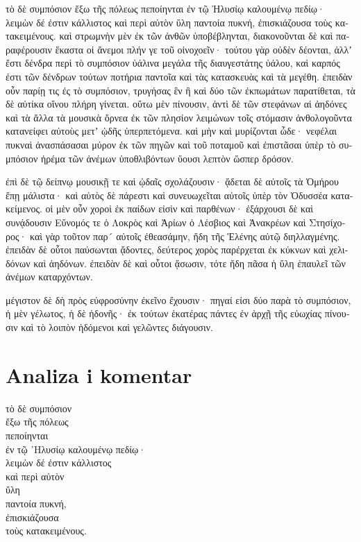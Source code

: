 {\large

\begin{greek}

\noindent τὸ δὲ συμπόσιον ἔξω τῆς πόλεως πεποίηνται ἐν τῷ Ἠλυσίῳ καλουμένῳ πεδίῳ· λειμὼν δέ ἐστιν κάλλιστος καὶ περὶ αὐτὸν ὕλη παντοία πυκνή, ἐπισκιάζουσα τοὺς κατακειμένους. καὶ στρωμνὴν μὲν ἐκ τῶν ἀνθῶν ὑποβέβληνται, διακονοῦνται δὲ καὶ παραφέρουσιν ἕκαστα οἱ ἄνεμοι πλήν γε τοῦ οἰνοχοεῖν· τούτου γὰρ οὐδὲν δέονται, ἀλλʼ ἔστι δένδρα περὶ τὸ συμπόσιον ὑάλινα μεγάλα τῆς διαυγεστάτης ὑάλου, καὶ καρπός ἐστι τῶν δένδρων τούτων ποτήρια παντοῖα καὶ τὰς κατασκευὰς καὶ τὰ μεγέθη. ἐπειδὰν οὖν παρίῃ τις ἐς τὸ συμπόσιον, τρυγήσας ἓν ἢ καὶ δύο τῶν ἐκπωμάτων παρατίθεται, τὰ δὲ αὐτίκα οἴνου πλήρη γίνεται. οὕτω μὲν πίνουσιν, ἀντὶ δὲ τῶν στεφάνων αἱ ἀηδόνες καὶ τὰ ἄλλα τὰ μουσικὰ ὄρνεα ἐκ τῶν πλησίον λειμώνων τοῖς στόμασιν ἀνθολογοῦντα κατανείφει αὐτοὺς μετʼ ᾠδῆς ὑπερπετόμενα. καὶ μὴν καὶ μυρίζονται ὧδε· νεφέλαι πυκναὶ ἀνασπάσασαι μύρον ἐκ τῶν πηγῶν καὶ τοῦ ποταμοῦ καὶ ἐπιστᾶσαι ὑπὲρ τὸ συμπόσιον ἠρέμα τῶν ἀνέμων ὑποθλιβόντων ὕουσι λεπτὸν ὥσπερ δρόσον.

\noindent ἐπὶ δὲ τῷ δείπνῳ μουσικῇ τε καὶ ᾠδαῖς σχολάζουσιν· ᾄδεται δὲ αὐτοῖς τὰ Ὁμήρου ἔπῃ μάλιστα· καὶ αὐτὸς δὲ πάρεστι καὶ συνευωχεῖται αὐτοῖς ὑπὲρ τὸν Ὀδυσσέα κατακείμενος. οἱ μὲν οὖν χοροὶ ἐκ παίδων εἰσὶν καὶ παρθένων· ἐξάρχουσι δὲ καὶ συνᾴδουσιν Εὔνομός τε ὁ Λοκρὸς καὶ Ἀρίων ὁ Λέσβιος καὶ Ἀνακρέων καὶ Στησίχορος· καὶ γὰρ τοῦτον παρ´ αὐτοῖς ἐθεασάμην, ἤδη τῆς Ἑλένης αὐτῷ διηλλαγμένης. ἐπειδὰν δὲ οὗτοι παύσωνται ᾄδοντες, δεύτερος χορὸς παρέρχεται ἐκ κύκνων καὶ χελιδόνων καὶ ἀηδόνων. ἐπειδὰν δὲ καὶ οὗτοι ᾄσωσιν, τότε ἤδη πᾶσα ἡ ὕλη ἐπαυλεῖ τῶν ἀνέμων καταρχόντων.

\noindent μέγιστον δὲ δὴ πρὸς εὐφροσύνην ἐκεῖνο ἔχουσιν· πηγαί εἰσι δύο παρὰ τὸ συμπόσιον, ἡ μὲν γέλωτος, ἡ δὲ ἡδονῆς· ἐκ τούτων ἑκατέρας πάντες ἐν ἀρχῇ τῆς εὐωχίας πίνουσιν καὶ τὸ λοιπὸν ἡδόμενοι καὶ γελῶντες διάγουσιν.

\end{greek}

}


\section*{Analiza i komentar}


{\large
\begin{greek}
\noindent τὸ δὲ συμπόσιον \\
 \tabto{2em} ἔξω τῆς πόλεως \\
πεποίηνται \\
\tabto{2em} ἐν τῷ ᾿Ηλυσίῳ καλουμένῳ πεδίῳ· \\
\tabto{4em} λειμὼν δέ ἐστιν κάλλιστος \\
\tabto{4em} καὶ περὶ αὐτὸν \\
\tabto{4em} ὕλη \\
\tabto{6em} παντοία πυκνή, \\
\tabto{6em} ἐπισκιάζουσα \\
\tabto{8em} τοὺς κατακειμένους. \\

\end{greek}
}

